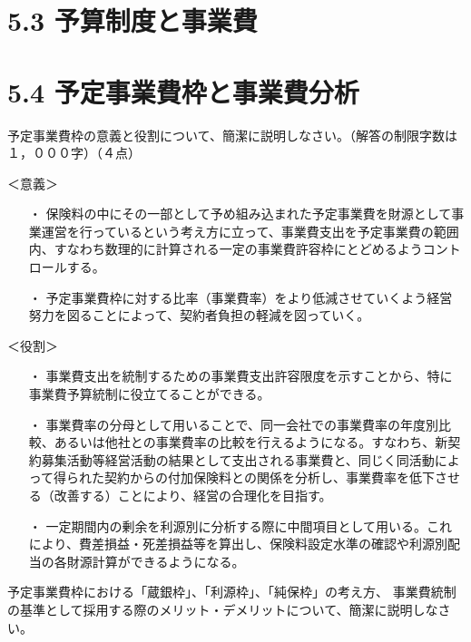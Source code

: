 \documentclass[report,gutter=10mm,fore-edge=10mm,uplatex,dvipdfmx]{jlreq}
\begin{document}
\section{5.3 予算制度と事業費}
\section{5.4 予定事業費枠と事業費分析}
予定事業費枠の意義と役割について、簡潔に説明しなさい。（解答の制限字数は１，０００字）（４点）

\answer{}
＜意義＞

\begin{itemize}
 \item [・]  保険料の中にその一部として予め組み込まれた予定事業費を財源として事業運営を行っているという考え方に立って、事業費支出を予定事業費の範囲内、すなわち数理的に計算される一定の事業費許容枠にとどめるようコントロールする。
 \item [・]  予定事業費枠に対する比率（事業費率）をより低減させていくよう経営努力を図ることによって、契約者負担の軽減を図っていく。
\end{itemize}

＜役割＞

\begin{itemize}
 \item [・]  事業費支出を統制するための事業費支出許容限度を示すことから、特に事業費予算統制に役立てることができる。
 \item [・]  事業費率の分母として用いることで、同一会社での事業費率の年度別比較、あるいは他社との事業費率の比較を行えるようになる。すなわち、新契約募集活動等経営活動の結果として支出される事業費と、同じく同活動によって得られた契約からの付加保険料との関係を分析し、事業費率を低下させる（改善する）ことにより、経営の合理化を目指す。
 \item [・]  一定期間内の剰余を利源別に分析する際に中間項目として用いる。これにより、費差損益・死差損益等を算出し、保険料設定水準の確認や利源別配当の各財源計算ができるようになる。
\end{itemize}

\vspace{1zh}
予定事業費枠における「蔵銀枠」、「利源枠」、「純保枠」の考え方、
事業費統制の基準として採用する際のメリット・デメリットについて、簡潔に説明しなさい。
\end{document}
